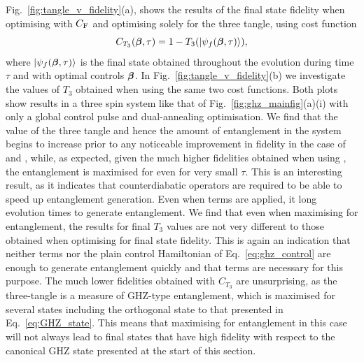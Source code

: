 Fig.~\ref{fig:tangle_v_fidelity}(a), shows the results of the final state fidelity when optimising with $C_{\rm F}$ and optimising solely for the three tangle, using cost function
\begin{equation}\label{eq:tangle_costfunc}
    C_{T_3}(\boldsymbol{\beta}, \tau) = 1 - T_3(\ket{\psi_f(\boldsymbol{\beta}, \tau)}),
\end{equation}
where $\ket{\psi_f(\boldsymbol{\beta}, \tau)}$ is the final state obtained throughout the evolution during time $\tau$ and with optimal controls $\boldsymbol{\beta}$. In Fig.~\ref{fig:tangle_v_fidelity}(b) we investigate the values of $T_3$ obtained when using the same two cost functions. Both plots show results in a three spin system like that of Fig.~\ref{fig:ghz_mainfig}(a)(i) with only a global control pulse and dual-annealing optimisation. We find that the value of the three tangle and hence the amount of entanglement in the system begins to increase prior to any noticeable improvement in fidelity in the case of  and  , while, as expected, given the much higher fidelities obtained when using  , the entanglement is maximised for even for very small $\tau$. This is an interesting result, as it indicates that  counterdiabatic operators are required to be able to speed up entanglement generation. Even when  terms are applied, it long evolution times to generate entanglement. We find that even when maximising for entanglement, the results for final $T_3$ values are not very different to those obtained when optimising for final state fidelity. This is again an indication that neither  terms nor the plain control Hamiltonian of Eq.~\eqref{eq:ghz_control} are enough to generate entanglement quickly and that  terms are necessary for this purpose. The much lower fidelities obtained with $C_{T_3}$ are unsurprising, as the three-tangle is a measure of GHZ-type entanglement, which is maximised for several states including the orthogonal state to that presented in Eq.~\eqref{eq:GHZ_state}. This means that maximising for entanglement in this case will not always lead to final states that have high fidelity with respect to the canonical GHZ state presented at the start of this section.

